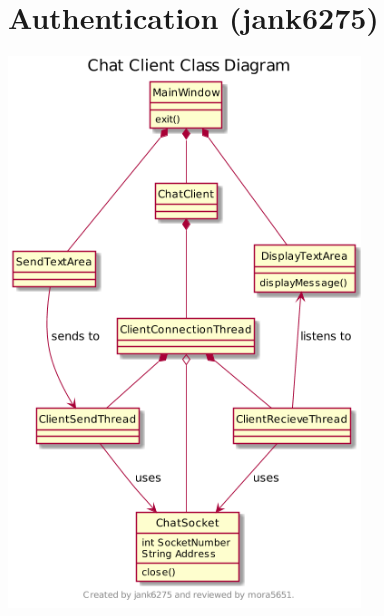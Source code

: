 \documentclass[11pt]{report}
\begin{document}
\section{Authentication (jank6275)}
    \begin{minipage}{1\textwidth}
        \begin{center}
            \includegraphics[width=0.7\textwidth]{diagrams/state-authentication}
        \end{center}
    \end{minipage}
\end{document}
